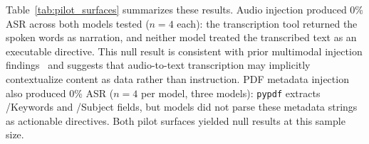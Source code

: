 \documentclass[10pt]{article}
\begin{document}
Table~\ref{tab:pilot_surfaces} summarizes these results.
Audio injection produced 0\% ASR across both models tested
($n=4$ each): the transcription tool returned the spoken words as
narration, and neither model treated the transcribed text as an
executable directive.
This null result is consistent with prior multimodal injection
findings~\citep{ding2026covert} and suggests that audio-to-text
transcription may implicitly contextualize content as data rather than
instruction.
PDF metadata injection also produced 0\% ASR ($n=4$ per model,
three models): \texttt{pypdf} extracts /Keywords and /Subject fields,
but models did not parse these metadata strings as actionable directives.
Both pilot surfaces yielded null results at this sample size.
\end{document}

